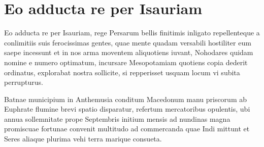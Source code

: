 \section{Eo adducta re per Isauriam}
\label{sec:isauriam}

Eo adducta re per Isauriam, rege Persarum bellis finitimis inligato
repellenteque a conlimitiis suis ferocissimas gentes, quae mente
quadam versabili hostiliter eum saepe incessunt et in nos arma
moventem aliquotiens iuvant, Nohodares quidam nomine e numero
optimatum, incursare Mesopotamiam quotiens copia dederit ordinatus,
explorabat nostra sollicite, si repperisset usquam locum vi subita
perrupturus.

Batnae municipium in Anthemusia conditum Macedonum manu priscorum ab
Euphrate flumine brevi spatio disparatur, refertum mercatoribus
opulentis, ubi annua sollemnitate prope Septembris initium mensis ad
nundinas magna promiscuae fortunae convenit multitudo ad commercanda
quae Indi mittunt et Seres aliaque plurima vehi terra marique
consueta.
  
